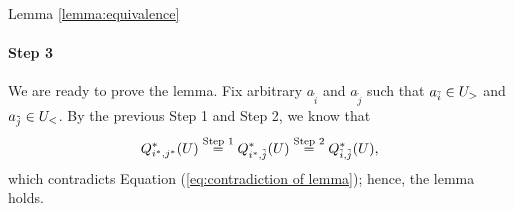 \begin{proofof}{Lemma \ref{lemma:equivalence}}
\paragraph{Step 3} We are ready to prove the lemma. Fix arbitrary $a_{\tilde i}$ and $a_{\tilde j}$ such that $a_{\tilde i} \in U_>$ and  $a_{\tilde j} \in U_<$. By the previous Step 1 and Step 2, we know that
\[
Q^*_{{i^*},{j^*}}(U)\stackrel{\textnormal{Step 1}}{=}Q^*_{{i^*},{\tilde j}}(U)\stackrel{\textnormal{Step 2}}{=}Q^*_{{\tilde i},{\tilde j}}(U),
\]
which contradicts Equation (\ref{eq:contradiction of lemma}); hence, the lemma holds.
\end{proofof}